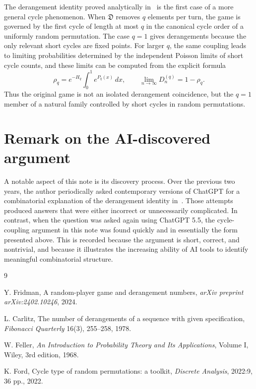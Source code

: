 \documentclass{article}
\newcommand{\Dplayer}{\mathfrak{D}}
\begin{document}
The derangement identity proved analytically in~\cite{fridman2024random} is
the first case of a more general cycle phenomenon. When $\Dplayer$ removes
$q$ elements per turn, the game is governed by the first cycle of length at
most $q$ in the canonical cycle order of a uniformly random permutation. The
case $q=1$ gives derangements because the only relevant short cycles are fixed
points. For larger $q$, the same coupling leads to limiting probabilities
determined by the independent Poisson limits of short cycle counts, and these
limits can be computed from the explicit formula
\[
    \rho_q=e^{-H_q}\int_0^1 e^{P_q(x)}\,dx,
    \qquad
    \lim_{n\to\infty}D_n^{(q)}=1-\rho_q .
\]
Thus the original game is not an isolated derangement coincidence, but the
$q=1$ member of a natural family controlled by short cycles in random
permutations.

\section*{Remark on the AI-discovered argument}

A notable aspect of this note is its discovery process. Over the previous two
years, the author periodically asked contemporary versions of ChatGPT for a
combinatorial explanation of the derangement identity in~\cite{fridman2024random}.
Those attempts produced answers that were either incorrect or unnecessarily
complicated. In contrast, when the question was asked again using ChatGPT 5.5,
the cycle-coupling argument in this note was found quickly and in essentially
the form presented above. This is recorded because the argument is short,
correct, and nontrivial, and because it illustrates the increasing ability of
AI tools to identify meaningful combinatorial structure.

\begin{thebibliography}{9}

Y. Fridman,
\newblock A random-player game and derangement numbers,
\newblock \emph{arXiv preprint arXiv:2402.10246}, 2024.

L. Carlitz,
\newblock The number of derangements of a sequence with given specification,
\newblock \emph{Fibonacci Quarterly} 16(3), 255--258, 1978.

W. Feller,
\newblock \emph{An Introduction to Probability Theory and Its Applications},
Volume I,
\newblock Wiley, 3rd edition, 1968.

K. Ford,
\newblock Cycle type of random permutations: a toolkit,
\newblock \emph{Discrete Analysis}, 2022:9, 36 pp., 2022.

\end{thebibliography}
\end{document}
